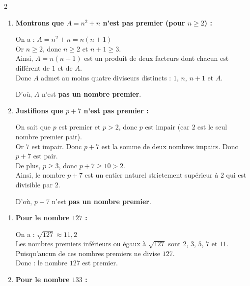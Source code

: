 \documentclass[10pt, a4paper]{article}
\begin{document}
\begin{multicols*}{2}
\begin{Solution}[APPLICATION][7]
\begin{enumerate}[leftmargin=*,itemsep=0.5pt]
    \item \textbf{Montrons que $A = n^2 + n$ n'est pas premier (pour $n \geq 2$) :}

    On a : $A = n^2 + n = n(n + 1)$ \\
    Or $n \geq 2$, donc $n \geq 2$ et $n + 1 \geq 3$. \\
    Ainsi, $A = n(n+1)$ est un produit de deux facteurs dont chacun est différent de $1$ et de $A$. \\
    Donc $A$ admet au moins quatre diviseurs distincts :
    $1$, $n$, $n+1$ et $A$. 
    
    D'où, $A$ n'est \textbf{pas un nombre premier}.

    \item \textbf{Justifions que $p + 7$ n'est pas premier :}

    On sait que $p$ est premier et $p > 2$, donc $p$ est impair (car $2$ est le seul nombre premier pair). \\
    Or $7$ est impair. Donc $p + 7$ est la somme de deux nombres impairs. 
    Donc $p + 7$ est pair. \\
    De plus, $p \geq 3$, donc $p + 7 \geq 10 > 2$. \\
    Ainsi, le nombre $p + 7$ est un entier naturel strictement supérieur à $2$ qui est divisible par $2$. 
    
    D'où, $p + 7$ n'est \textbf{pas un nombre premier}.
\end{enumerate}
\end{Solution}

\begin{Solution}[APPLICATION][8]
\begin{enumerate}[leftmargin=*,itemsep=0.5pt]
    \item \textbf{Pour le nombre $127$ :}

    On a : $\sqrt{127} \approx 11,2$ \\
    Les nombres premiers inférieurs ou égaux à $\sqrt{127}$ sont $2$, $3$, $5$, $7$ et $11$. \\
    Puisqu'aucun de ces nombres premiers ne divise $127$. \\
    Donc : \quad le nombre $127$ est premier.

    \item \textbf{Pour le nombre $133$ :}


\end{enumerate}
\end{Solution}
\end{multicols*}
\end{document}
